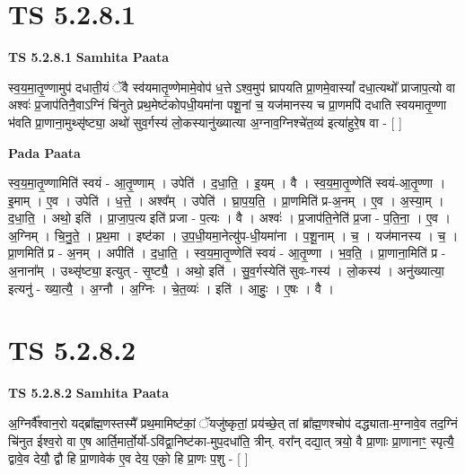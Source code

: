 \documentclass[17pt]{extarticle}
\begin{document}

\section{ TS 5.2.8.1 }

\textbf{TS 5.2.8.1 } \newline
\textbf{Samhita Paata} \newline

स्व॒य॒मा॒तृ॒ण्णामुप॑ दधाती॒यं ॅवै स्व॑यमातृ॒ण्णेमामे॒वोप॑ ध॒त्ते ऽश्व॒मुप॑ घ्रापयति प्रा॒णमे॒वास्यां᳚ दधा॒त्यथो᳚ प्राजाप॒त्यो वा अश्वः॑ प्र॒जाप॑तिनै॒वाऽग्निं चि॑नुते प्रथ॒मेष्ट॑कोपधी॒यमा॑ना पशू॒नां च॒ यज॑मानस्य च प्रा॒णमपि॑ दधाति स्वयमातृ॒ण्णा भ॑वति प्रा॒णाना॒मुथ्सृ॑ष्ट्या॒ अथो॑ सुव॒र्गस्य॑ लो॒कस्यानु॑ख्यात्या अ॒ग्नाव॒ग्निश्चे॑त॒व्य॑ इत्या॑हुरे॒ष वा - [  ] \newline

\textbf{Pada Paata} \newline

स्व॒य॒मा॒तृ॒ण्णामिति॑ स्वयं - आ॒तृ॒ण्णाम् । उपेति॑ । द॒धा॒ति॒ । इ॒यम् । वै । स्व॒य॒मा॒तृ॒ण्णेति॑ स्वयं-आ॒तृ॒ण्णा । इ॒माम् । ए॒व । उपेति॑ । ध॒त्ते॒ । अश्व᳚म् । उपेति॑ । घ्रा॒प॒य॒ति॒ । प्रा॒णमिति॑ प्र-अ॒नम् । ए॒व । अ॒स्या॒म् । द॒धा॒ति॒ । अथो॒ इति॑ । प्रा॒जा॒प॒त्य इति॑ प्रजा - प॒त्यः । वै । अश्वः॑ । प्र॒जाप॑ति॒नेति॑ प्र॒जा - प॒ति॒ना॒ । ए॒व । अ॒ग्निम् । चि॒नु॒ते॒ । प्र॒थ॒मा । इष्ट॑का । उ॒प॒धी॒यमा॒नेत्यु॑प-धी॒यमा॑ना । प॒शू॒नाम् । च॒ । यज॑मानस्य । च॒ । प्रा॒णमिति॑ प्र - अ॒नम् । अपीति॑ । द॒धा॒ति॒ । स्व॒य॒मा॒तृ॒ण्णेति॑ स्वयं - आ॒तृ॒ण्णा । भ॒व॒ति॒ । प्रा॒णाना॒मिति॑ प्र - अ॒नाना᳚म् । उथ्सृ॑ष्ट्या॒ इत्युत् - सृ॒ष्ट्यै॒ । अथो॒ इति॑ । सु॒व॒र्गस्येति॑ सुवः-गस्य॑ । लो॒कस्य॑ । अनु॑ख्यात्या॒ इत्यनु॑ - ख्या॒त्यै॒ । अ॒ग्नौ । अ॒ग्निः । चे॒त॒व्यः॑ । इति॑ । आ॒हुः॒ । ए॒षः । वै ।  \newline





\section{ TS 5.2.8.2 }

\textbf{TS 5.2.8.2 } \newline
\textbf{Samhita Paata} \newline

अ॒ग्निर्वै᳚श्वान॒रो यद्ब्रा᳚ह्म॒णस्तस्मै᳚ प्रथ॒मामिष्ट॑कां॒ ॅयजु॑ष्कृतां॒ प्रय॑च्छे॒त् तां ब्रा᳚ह्म॒णश्चोप॑ दद्ध्याता-म॒ग्नावे॒व तद॒ग्निं चि॑नुत ईश्व॒रो वा ए॒ष आर्ति॒मार्तो॒र्यो-ऽवि॑द्वा॒निष्ट॑का-मुप॒दधा॑ति॒ त्रीन्. वरा᳚न् दद्या॒त् त्रयो॒ वै प्रा॒णाः प्रा॒णानाꣳ॒॒ स्पृत्यै॒ द्वावे॒व देयौ॒ द्वौ हि प्रा॒णावेक॑ ए॒व देय॒ एको॒ हि प्रा॒णः प॒शु - [  ] \newline
\end{document}
